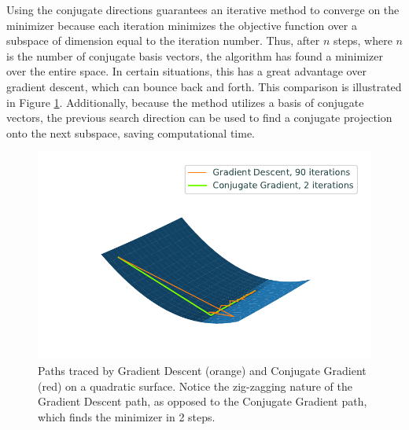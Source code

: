 

Using the conjugate directions guarantees an iterative method to converge on the minimizer because each iteration minimizes the objective function over a subspace of dimension equal to the iteration number.
Thus, after $n$ steps, where $n$ is the number of conjugate basis vectors, the algorithm has found a minimizer over the entire space.
In certain situations, this has a great advantage over gradient descent, which can bounce back and forth.
This comparison is illustrated in Figure \ref{basis:steepVsConj}.
Additionally, because the method utilizes a basis of conjugate vectors, the previous search direction can be used to find a conjugate projection onto the next subspace, saving computational time.

\begin{figure}[H]
\centering
\includegraphics[width=.7\textwidth]{figures/steepVsConj.pdf}
\caption{Paths traced by Gradient Descent (orange) and Conjugate Gradient (red) on a quadratic surface.
Notice the zig-zagging nature of the Gradient Descent path, as opposed to the Conjugate Gradient path, which finds the minimizer in 2 steps.}
\label{basis:steepVsConj}
\end{figure}


